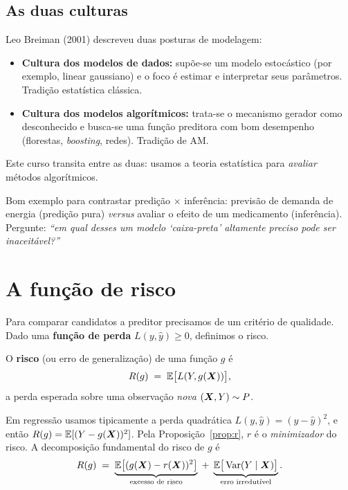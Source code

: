 \documentclass[11pt,a4paper]{article}
\begin{document}
\subsection{As duas culturas}
Leo Breiman (2001) descreveu duas posturas de modelagem:
\begin{itemize}[leftmargin=1.4cm]
  \item \textbf{Cultura dos modelos de dados:} supõe-se um modelo estocástico
        (por exemplo, linear gaussiano) e o foco é estimar e interpretar seus
        parâmetros. Tradição estatística clássica.
  \item \textbf{Cultura dos modelos algorítmicos:} trata-se o mecanismo gerador
        como desconhecido e busca-se uma função preditora com bom desempenho
        (florestas, \emph{boosting}, redes). Tradição de AM.
\end{itemize}
Este curso transita entre as duas: usamos a teoria estatística para \emph{avaliar}
métodos algorítmicos.

\begin{emsala}
Bom exemplo para contrastar predição $\times$ inferência: previsão de demanda de
energia (predição pura) \emph{versus} avaliar o efeito de um medicamento
(inferência). Pergunte: \emph{``em qual desses um modelo `caixa-preta'
altamente preciso pode ser inaceitável?''}
\end{emsala}

\section{A função de risco}
Para comparar candidatos a preditor precisamos de um critério de qualidade. Dado
uma \textbf{função de perda} $L(y,\hat y)\ge 0$, definimos o risco.

\begin{definicao}[Risco]
O \textbf{risco} (ou erro de generalização) de uma função $g$ é
\begin{equation}\label{eq:risco}
  R(g) \;=\; \mathbb{E}\big[L(Y,g(\bm{X}))\big],
\end{equation}
a perda esperada sobre uma observação \emph{nova} $(\bm{X},Y)\sim P$.
\end{definicao}

Em regressão usamos tipicamente a perda quadrática $L(y,\hat y)=(y-\hat y)^2$, e
então $R(g)=\mathbb{E}[(Y-g(\bm{X}))^2]$. Pela Proposição~\ref{prop:r}, $r$ é o
\emph{minimizador} do risco. A decomposição fundamental do risco de $g$ é
\begin{equation}\label{eq:decomprisco}
  R(g) \;=\; \underbrace{\mathbb{E}\big[(g(\bm{X})-r(\bm{X}))^2\big]}_{\text{excesso de risco}}
              \;+\; \underbrace{\mathbb{E}\big[\operatorname{Var}(Y\mid\bm{X})\big]}_{\text{erro irredutível}}.
\end{equation}
\end{document}
